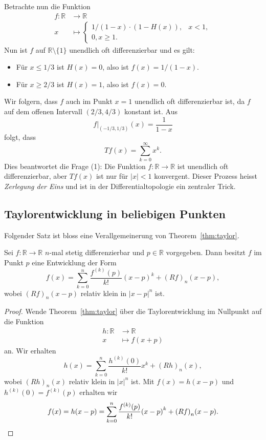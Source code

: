 \documentclass[../main.tex]{subfiles}
\begin{document}
\begin{examples}
\begin{enumerate}[(1)]
      Betrachte nun die Funktion
      \begin{align*}
        f \colon \mathbb{R} & \to \mathbb{R} \\
        x & \mapsto 
        \begin{cases}
          1/(1- x) \cdot (1 - H(x)), & x < 1,\\
          0, x \geq 1.
        \end{cases}
      \end{align*}
      Nun ist $f$ auf $\mathbb{R} \setminus \{1\}$
      unendlich oft differenzierbar und es gilt:
      \begin{itemize}
        \item Für $x \leq 1/3$ ist $H(x) = 0$, also
          ist $f(x) = 1/(1- x)$.
        \item Für $x \geq 2/3$ ist $H(x) = 1$, also
          ist $f(x) = 0$.
      \end{itemize}
      Wir folgern, dass $f$ auch im Punkt $x = 1$ 
      unendlich oft differenzierbar ist,
      da $f$ auf dem offenen Intervall $(2/3, 4/3)$ konstant ist.
      Aus
      \[
        f|_{(-1/3, 1/3)}(x) = \frac{1}{1-x}
      \]
      folgt, dass
      \[
        Tf(x) = \sum_{k=0}^{\infty} x^k.
      \]
      Dies beantwortet die Frage (1): Die Funktion $f \colon \mathbb{R} \to \mathbb{R}$ 
      ist unendlich oft differenzierbar, aber $Tf(x)$ ist nur für $|x| < 1$ konvergent.
      Dieser Prozess heisst \emph{Zerlegung der Eins} und ist in der Differentialtopologie
      ein zentraler Trick.
  \end{enumerate}
\end{examples}

\subsection*{Taylorentwicklung in beliebigen Punkten}
Folgender Satz ist bloss eine Verallgemeinerung von Theorem~\ref{thm:taylor}.

\begin{theorem}
  Sei $f \colon \mathbb{R} \to \mathbb{R}$ $n$-mal stetig differenzierbar
  und $p \in \mathbb{R}$ vorgegeben.
  Dann besitzt $f$ im Punkt $p$ eine Entwicklung der Form
  \[
    f(x) = \sum_{k=0}^{n} \frac{f^{(k)}(p)}{k!} {(x - p)}^k + {(Rf)}_n(x - p),
  \]
  wobei ${(Rf)}_n (x - p)$ relativ klein in $|x - p|^n$ ist.
\end{theorem}

\begin{proof}
  Wende Theorem~\ref{thm:taylor} über die Taylorentwicklung im Nullpunkt
  auf die Funktion
  \begin{align*}
    h \colon \mathbb{R} & \to \mathbb{R} \\
    x & \mapsto f(x + p)
  \end{align*}
  an. Wir erhalten
  \[
    h(x) = \sum_{k=0}^{n} \frac{h^{(k)}(0)}{k!} x^k + {(Rh)}_n(x),
  \]
  wobei ${(Rh)}_n(x)$ relativ klein in $|x|^n$ ist.
  Mit $f(x) = h(x - p)$ und $h^{(k)}(0) = f^{(k)}(p)$ erhalten wir
  \[
    f(x) = h(x - p) = \sum_{k=0}^{n} \frac{f^{(k)}(p)}{k!}{(x-p)}^k + {(Rf)}_n(x-p).
    \qedhere
  \]
\end{proof}
\end{document}
